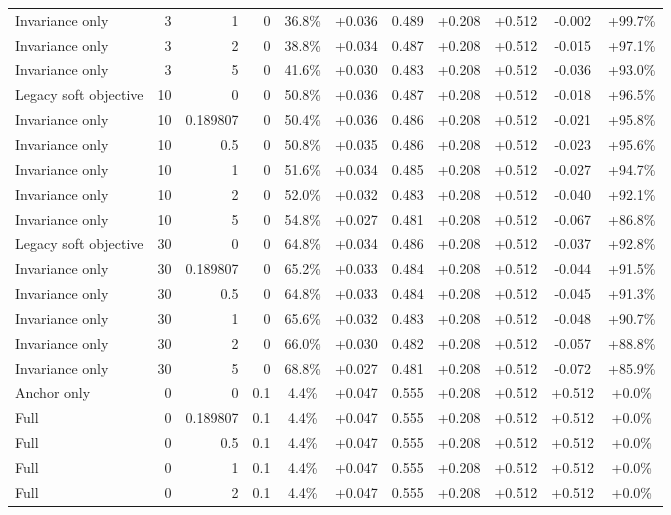 \begin{table}[htbp]
\begin{tabular}{lrrrccccccc}
Invariance only & 3 & 1 & 0 & 36.8\% & +0.036 & 0.489 & +0.208 & +0.512 & -0.002 & +99.7\% \\
Invariance only & 3 & 2 & 0 & 38.8\% & +0.034 & 0.487 & +0.208 & +0.512 & -0.015 & +97.1\% \\
Invariance only & 3 & 5 & 0 & 41.6\% & +0.030 & 0.483 & +0.208 & +0.512 & -0.036 & +93.0\% \\
Legacy soft objective & 10 & 0 & 0 & 50.8\% & +0.036 & 0.487 & +0.208 & +0.512 & -0.018 & +96.5\% \\
Invariance only & 10 & 0.189807 & 0 & 50.4\% & +0.036 & 0.486 & +0.208 & +0.512 & -0.021 & +95.8\% \\
Invariance only & 10 & 0.5 & 0 & 50.8\% & +0.035 & 0.486 & +0.208 & +0.512 & -0.023 & +95.6\% \\
Invariance only & 10 & 1 & 0 & 51.6\% & +0.034 & 0.485 & +0.208 & +0.512 & -0.027 & +94.7\% \\
Invariance only & 10 & 2 & 0 & 52.0\% & +0.032 & 0.483 & +0.208 & +0.512 & -0.040 & +92.1\% \\
Invariance only & 10 & 5 & 0 & 54.8\% & +0.027 & 0.481 & +0.208 & +0.512 & -0.067 & +86.8\% \\
Legacy soft objective & 30 & 0 & 0 & 64.8\% & +0.034 & 0.486 & +0.208 & +0.512 & -0.037 & +92.8\% \\
Invariance only & 30 & 0.189807 & 0 & 65.2\% & +0.033 & 0.484 & +0.208 & +0.512 & -0.044 & +91.5\% \\
Invariance only & 30 & 0.5 & 0 & 64.8\% & +0.033 & 0.484 & +0.208 & +0.512 & -0.045 & +91.3\% \\
Invariance only & 30 & 1 & 0 & 65.6\% & +0.032 & 0.483 & +0.208 & +0.512 & -0.048 & +90.7\% \\
Invariance only & 30 & 2 & 0 & 66.0\% & +0.030 & 0.482 & +0.208 & +0.512 & -0.057 & +88.8\% \\
Invariance only & 30 & 5 & 0 & 68.8\% & +0.027 & 0.481 & +0.208 & +0.512 & -0.072 & +85.9\% \\
Anchor only & 0 & 0 & 0.1 & 4.4\% & +0.047 & 0.555 & +0.208 & +0.512 & +0.512 & +0.0\% \\
Full & 0 & 0.189807 & 0.1 & 4.4\% & +0.047 & 0.555 & +0.208 & +0.512 & +0.512 & +0.0\% \\
Full & 0 & 0.5 & 0.1 & 4.4\% & +0.047 & 0.555 & +0.208 & +0.512 & +0.512 & +0.0\% \\
Full & 0 & 1 & 0.1 & 4.4\% & +0.047 & 0.555 & +0.208 & +0.512 & +0.512 & +0.0\% \\
Full & 0 & 2 & 0.1 & 4.4\% & +0.047 & 0.555 & +0.208 & +0.512 & +0.512 & +0.0\% \\

\end{tabular}
\end{table}
